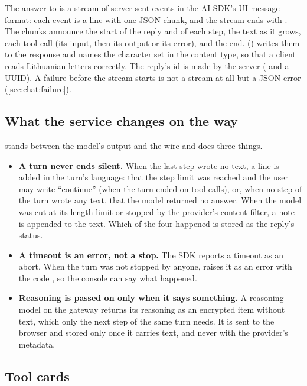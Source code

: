 The answer to  is a stream of server-sent events in the AI
SDK's UI message format: each event is a line  with one JSON chunk, and the stream
ends with . The chunks announce the start of the reply and of each step, the
text as it grows, each tool call (its input, then its output or its error), and the end.
 () writes them to the response and names the
character set in the content type, so that a client reads Lithuanian letters correctly. The
reply's id is made by the server ( and a UUID). A failure before the stream starts
is not a stream at all but a JSON error (\cref{sec:chat:failure}).

\subsection{What the service changes on the way}\label{sec:chat:shape}

 stands between the model's output and the wire and does three things.

\begin{itemize}
  \item \textbf{A turn never ends silent.} When the last step wrote no text, a line is added in
    the turn's language: that the step limit was reached and the user may write
    \enquote{continue} (when the turn ended on tool calls), or, when no step of the turn wrote
    any text, that the model returned no answer. When the model was cut at its length limit or stopped by the provider's content
    filter, a note is appended to the text. Which of the four happened is stored as the
    reply's status.
  \item \textbf{A timeout is an error, not a stop.} The SDK reports a timeout as an abort.
    When the turn was not stopped by anyone,  raises it as an error with the
    code , so the console can say what happened.
  \item \textbf{Reasoning is passed on only when it says something.} A reasoning model on the
    gateway returns its reasoning as an encrypted item without text, which only the next step
    of the same turn needs. It is sent to the browser and stored only once it carries text, and
    never with the provider's metadata.
\end{itemize}

\subsection{Tool cards}\label{sec:chat:cards}

